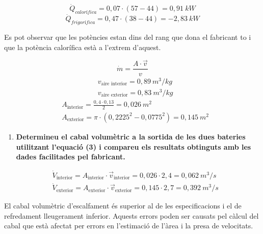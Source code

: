 \documentclass[a4paper]{article}
\newenvironment{questionenum}{%
	\setlist[enumerate]{resume}
	\restartlist{enumerate}
	\newcommand{\question}[1]{
		\begin{enumerate}
			\item\bfseries ##1
		\end{enumerate}
}}{%
}
\begin{document}
\begin{questionenum}
    $$
    \dot{Q}_{calorífica} = 0,07·(57 - 44) = \boxed{0,91 \ kW}
    $$
    $$
    \dot{Q}_{frigorífica} = 0,47·(38 - 44) = \boxed{-2,83 \ kW}
    $$
    
    Es pot observar que les potències estan dins del rang que dona el fabricant to i que la potència calorífica està a l'extrem d'aquest.
    
    $$
    \dot{m} = \frac{A·\vec{v}}{v}
    $$
    \begin{align*}
        & v_{\text{aire interior}} = 0,89 \ m^3/kg \\
        & v_{\text{aire exterior}} = 0,83 \ m^3/kg
    \end{align*}
    \begin{align*}
        & A_{\text{interior}} = \frac{0,4 \cdot 0,13}{2} = 0,026 \ m^2 \\
        & A_{\text{exterior}} = \pi \cdot (0,2225^2 - 0,0775^2) = 0,145 \ m^2
    \end{align*}
    
    
    
	\question{Determineu el cabal volumètric a la sortida de les dues bateries utilitzant l'equació (3) i compareu els resultats obtinguts amb les dades facilitades pel fabricant.}
    
    \begin{align*}
        & \dot{V}_{\text{interior}} = A_{\text{interior}} \cdot \vec{v}_{\text{interior}} = 0,026 \cdot 2,4 =  \boxed{0,062 \ m^3/s} \\
        & \dot{V}_{\text{exterior}} = A_{\text{exterior}} \cdot \vec{v}_{\text{exterior}} = 0,145 \cdot 2,7 = \boxed{0,392 \ m^3/s}
    \end{align*}
    
    El cabal volumètric d'escalfament és superior al de les especificacions i el de refredament lleugerament inferior. Aquests errors poden ser causats pel càlcul del cabal que està afectat per errors en l'estimació de l'àrea i la presa de velocitats.
\end{questionenum}
\end{document}
